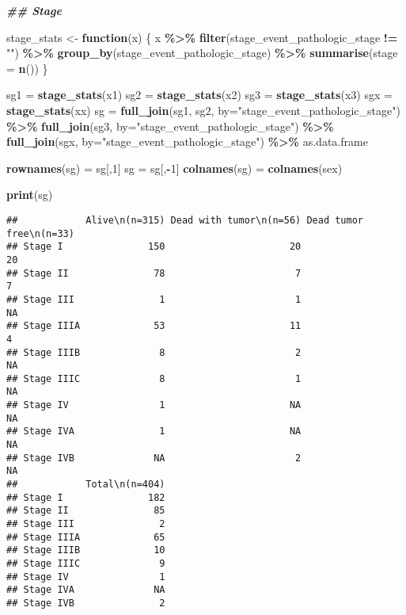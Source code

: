 \documentclass[
]{article}
\newenvironment{Shaded}{\begin{snugshade}}{\end{snugshade}}
\newcommand{\AttributeTok}[1]{\textcolor[rgb]{0.13,0.29,0.53}{#1}}
\newcommand{\ControlFlowTok}[1]{\textcolor[rgb]{0.13,0.29,0.53}{\textbf{#1}}}
\newcommand{\DecValTok}[1]{\textcolor[rgb]{0.00,0.00,0.81}{#1}}
\newcommand{\DocumentationTok}[1]{\textcolor[rgb]{0.56,0.35,0.01}{\textbf{\textit{#1}}}}
\newcommand{\FunctionTok}[1]{\textcolor[rgb]{0.13,0.29,0.53}{\textbf{#1}}}
\newcommand{\NormalTok}[1]{#1}
\newcommand{\OtherTok}[1]{\textcolor[rgb]{0.56,0.35,0.01}{#1}}
\newcommand{\SpecialCharTok}[1]{\textcolor[rgb]{0.81,0.36,0.00}{\textbf{#1}}}
\newcommand{\StringTok}[1]{\textcolor[rgb]{0.31,0.60,0.02}{#1}}
\begin{document}
\begin{Shaded}
\begin{Highlighting}[]
\DocumentationTok{\#\# Stage}

\NormalTok{stage\_stats }\OtherTok{\textless{}{-}} \ControlFlowTok{function}\NormalTok{(x) \{}
\NormalTok{    x }\SpecialCharTok{\%\textgreater{}\%} \FunctionTok{filter}\NormalTok{(stage\_event\_pathologic\_stage }\SpecialCharTok{!=} \StringTok{""}\NormalTok{) }\SpecialCharTok{\%\textgreater{}\%} 
        \FunctionTok{group\_by}\NormalTok{(stage\_event\_pathologic\_stage) }\SpecialCharTok{\%\textgreater{}\%} \FunctionTok{summarise}\NormalTok{(}\AttributeTok{stage =} \FunctionTok{n}\NormalTok{())}
\NormalTok{\}}

\NormalTok{sg1 }\OtherTok{=} \FunctionTok{stage\_stats}\NormalTok{(x1)}
\NormalTok{sg2 }\OtherTok{=} \FunctionTok{stage\_stats}\NormalTok{(x2)}
\NormalTok{sg3 }\OtherTok{=} \FunctionTok{stage\_stats}\NormalTok{(x3)}
\NormalTok{sgx }\OtherTok{=} \FunctionTok{stage\_stats}\NormalTok{(xx)}
\NormalTok{sg }\OtherTok{=} \FunctionTok{full\_join}\NormalTok{(sg1, sg2, }\AttributeTok{by=}\StringTok{"stage\_event\_pathologic\_stage"}\NormalTok{) }\SpecialCharTok{\%\textgreater{}\%} 
    \FunctionTok{full\_join}\NormalTok{(sg3, }\AttributeTok{by=}\StringTok{"stage\_event\_pathologic\_stage"}\NormalTok{) }\SpecialCharTok{\%\textgreater{}\%} 
    \FunctionTok{full\_join}\NormalTok{(sgx, }\AttributeTok{by=}\StringTok{"stage\_event\_pathologic\_stage"}\NormalTok{) }\SpecialCharTok{\%\textgreater{}\%} 
\NormalTok{    as.data.frame}

\FunctionTok{rownames}\NormalTok{(sg) }\OtherTok{=}\NormalTok{ sg[,}\DecValTok{1}\NormalTok{]}
\NormalTok{sg }\OtherTok{=}\NormalTok{ sg[,}\SpecialCharTok{{-}}\DecValTok{1}\NormalTok{]}
\FunctionTok{colnames}\NormalTok{(sg) }\OtherTok{=} \FunctionTok{colnames}\NormalTok{(sex)}

\FunctionTok{print}\NormalTok{(sg)}
\end{Highlighting}
\end{Shaded}

\begin{verbatim}
##            Alive\n(n=315) Dead with tumor\n(n=56) Dead tumor free\n(n=33)
## Stage I               150                      20                      20
## Stage II               78                       7                       7
## Stage III               1                       1                      NA
## Stage IIIA             53                      11                       4
## Stage IIIB              8                       2                      NA
## Stage IIIC              8                       1                      NA
## Stage IV                1                      NA                      NA
## Stage IVA               1                      NA                      NA
## Stage IVB              NA                       2                      NA
##            Total\n(n=404)
## Stage I               182
## Stage II               85
## Stage III               2
## Stage IIIA             65
## Stage IIIB             10
## Stage IIIC              9
## Stage IV                1
## Stage IVA              NA
## Stage IVB               2
\end{verbatim}
\end{document}
